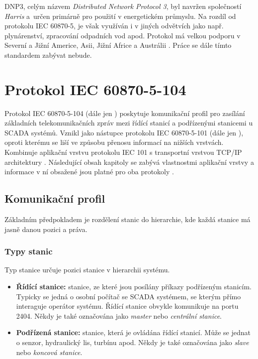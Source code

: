 DNP3, celým názvem \emph{Distributed Network Protocol 3}, byl navržen společností \emph{Harris} a~určen primárně pro použití v energetickém průmyslu. Na rozdíl od protokolu IEC 60870-5, je však využíván i v jiných odvětvích jako např. plynárenství, zpracování odpadních vod apod. Protokol má velkou podporu v Severní a Jižní Americe, Asii, Jižní Africe a Austrálii \cite{scada_protocols}. Práce se dále tímto standardem zabývat nebude.

\section{Protokol IEC 60870-5-104}

\label{iec_104}

Protokol IEC 60870-5-104 (dále jen ) poskytuje komunikační profil pro zasílání základních telekomunikačních zpráv mezi řídící stanicí a podřízenými stanicemi u SCADA systémů. Vznikl jako nástupce protokolu IEC 60870-5-101 (dále jen ), oproti kterému se liší ve způsobu přenosu informací na nižších vrstvách. Kombinuje aplikační vrstvu protokolu IEC 101 s transportní vrstvou TCP/IP architektury \cite{scada_protocols}. Následující obsah kapitoly se zabývá vlastnostmi aplikační vrstvy a informace v ní obsažené jsou platné pro oba protokoly \cite{iec_104}.

\subsection{Komunikační profil}

Základním předpokladem je rozdělení stanic do hierarchie, kde každá stanice má jasně danou pozici a práva.

\subsubsection*{Typy stanic}

Typ stanice určuje pozici stanice v hierarchii systému.

\begin{itemize}
    \item \textbf{Řídící stanice:} stanice, ze které jsou posílány příkazy podřízeným stanicím. Typicky se jedná o osobní počítač se SCADA systémem, se kterým přímo interaguje operátor systému. Řídící stanice obvykle komunikuje na portu 2404. Někdy je také označována jako \emph{master} nebo \emph{centrální stanice}. 
    \item \textbf{Podřízená stanice:} stanice, která je ovládána řídící stanicí. Může se jednat o senzor, hydraulický lis, turbínu apod. Někdy je také označována jako \emph{slave} nebo \emph{koncová stanice}.
\end{itemize}

